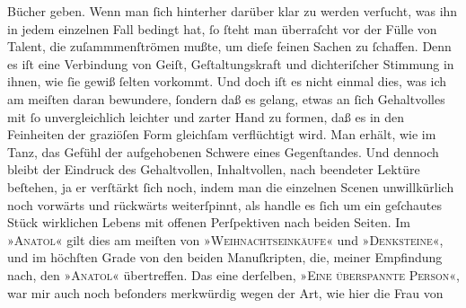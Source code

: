 \begin{ledgroupsized}[t]{13cm}
               Bücher geben. Wenn man ſich hinterher darüber klar zu werden verſucht, was ihn in
               jedem einzelnen Fall bedingt hat, ſo ſteht man überraſcht vor der Fülle von Talent,
               die zuſammmenſtrömen mußte, um dieſe feinen Sachen zu ſchaffen. Denn es iſt eine
               Verbindung von Geiſt, Geſtaltungskraft und dichteriſcher Stimmung in ihnen, wie ſie
               gewiß ſelten vorkommt. Und doch iſt es nicht einmal dies, was ich am meiſten {\pb}daran bewundere, ſondern daß es gelang,
               etwas an ſich Gehaltvolles mit ſo unvergleichlich leichter und zarter Hand zu formen,
               daß es in den Feinheiten der graziöſen Form gleichſam verflüchtigt wird. Man erhält,
               wie im Tanz, das Gefühl der aufgehobenen Schwere eines Gegenſtandes. Und dennoch
               bleibt der Eindruck des Gehaltvollen, Inhaltvollen, nach beendeter Lektüre beſtehen,
               ja er verſtärkt ſich noch, indem man die einzelnen Scenen unwillkürlich noch vorwärts
               und rückwärts weiterſpinnt, als handle es ſich um ein geſchautes Stück wirklichen
               Lebens mit offenen Perſpektiven nach beiden Seiten. Im »\textsc{Anatol}« gilt dies am meiſten von »\textsc{Weihnachtseinkäufe}« und »\textsc{Denksteine}«, und im höchſten Grade von den beiden Manuſkripten, die, meiner Empfindung
               nach, den »\textsc{Anatol}« übertreffen. Das eine derſelben, »\textsc{Eine überspannte Person}«, war mir auch noch beſonders merkwürdig wegen der Art, wie hier die Frau von

\end{ledgroupsized}

